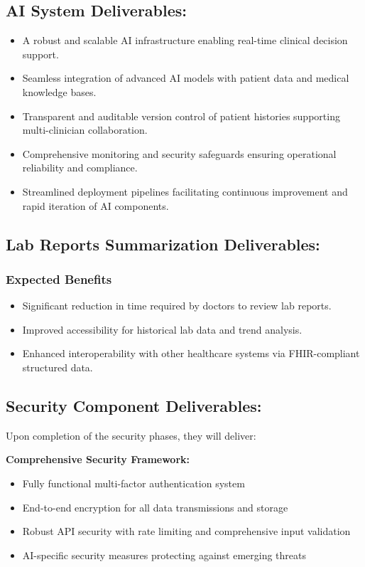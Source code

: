 \documentclass[a4paper, 12pt]{article}
\begin{document}
\subsection{AI System Deliverables:}
\begin{itemize}
    \item A robust and scalable AI infrastructure enabling real-time clinical decision support.
    \item Seamless integration of advanced AI models with patient data and medical knowledge bases.
    \item Transparent and auditable version control of patient histories supporting multi-clinician collaboration.
    \item Comprehensive monitoring and security safeguards ensuring operational reliability and compliance.
    \item Streamlined deployment pipelines facilitating continuous improvement and rapid iteration of AI components.
\end{itemize}


\subsection{Lab Reports Summarization Deliverables:}

\subsubsection{Expected Benefits}
\begin{itemize}
    \item Significant reduction in time required by doctors to review lab reports.
    \item Improved accessibility for historical lab data and trend analysis.
    \item Enhanced interoperability with other healthcare systems via FHIR-compliant structured data.
\end{itemize}


\subsection{Security Component Deliverables:}

Upon completion of the security phases, they will deliver:

\textbf{Comprehensive Security Framework:}
\begin{itemize}
    \item Fully functional multi-factor authentication system 
    \item End-to-end encryption for all data transmissions and storage
    \item Robust API security with rate limiting and comprehensive input validation
    \item AI-specific security measures protecting against emerging threats
\end{itemize}
\end{document}
